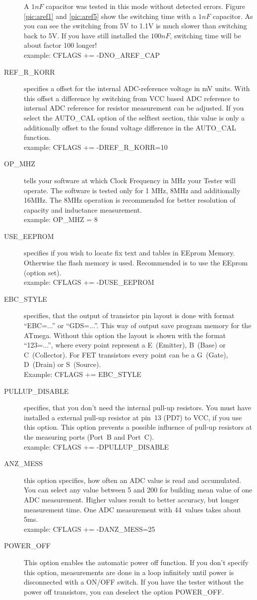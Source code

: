 \begin{description}
A \(1 nF\) capacitor was tested in this mode without detected errors.
Figure \ref{pic:aref1} and \ref{pic:aref5} show the switching time with a \(1 nF\) capacitor.
As you can see the switching from 5V to 1.1V is much slower than switching back to 5V. If you
have still installed the \(100 nF\), switching time will be about factor 100 longer!\\
example: CFLAGS += -DNO\_AREF\_CAP
  \item[REF\_R\_KORR] specifies a offset for the internal ADC-reference voltage in mV units.
With this offset a difference by switching from VCC based ADC reference to internal ADC reference for resistor measurement can be adjusted.
If you select the AUTO\_CAL option of the selftest section, this value is only a additionally offset to the found voltage 
difference in the AUTO\_CAL function.\\
example: CFLAGS += -DREF\_R\_KORR=10
  \item[OP\_MHZ] tells your software at which Clock Frequency in MHz your Tester will operate.
The software is tested only for 1 MHz, 8MHz and additionally 16MHz. 
The 8MHz operation is recommended for better resolution of capacity and inductance measurement.\\
example: OP\_MHZ = 8
  \item[USE\_EEPROM] specifies if you wish to locate fix text and tables in EEprom Memory. Otherwise the flash memory is used.
Recommended is to use the EEprom (option set).\\
example: CFLAGS += -DUSE\_EEPROM
\item[EBC\_STYLE] specifies, that the output of transistor pin layout is done with format ``EBC=...'' or ``GDS=...''.
This way of output save program memory for the ATmega. Without this option the layout is shown with the
format ``123=...'', where every point represent a E~(Emitter), B~(Base) or C~(Collector).
For FET transistors every point can be a G~(Gate), D~(Drain) or S~(Source).\\
Example: CFLAGS += EBC\_STYLE
\item[PULLUP\_DISABLE] specifies, that you don't need the internal pull-up resistors.
 You must have installed a external pull-up resistor at pin~13 (PD7) to VCC, if you use this option.
This option prevents a possible influence of pull-up resistors at the measuring ports (Port~B and Port~C).\\
example: CFLAGS += -DPULLUP\_DISABLE
  \item[ANZ\_MESS] this option specifies, how often an ADC value is read and accumulated.
You can select any value between 5 and 200 for building mean value of one ADC measurement.
Higher values result to better accuracy, but  longer measurement time.
One ADC measurement with 44~values takes about 5ms.\\
example: CFLAGS += -DANZ\_MESS=25
  \item[POWER\_OFF] This option enables the automatic power off function. If you don't specify this option,
 measurements are done in a loop infinitely  until power is disconnected with a ON/OFF switch.
If you have the tester without the power off transistors, you can deselect the option POWER\_OFF.


\end{description}
